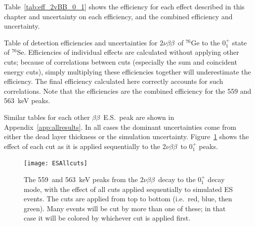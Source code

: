 \documentclass[notitlepage,rmp,aps,10pt]{revtex4-1}
\newcommand{\bb}{${\beta \beta}$}
\newcommand{\tnbb}{${2 \nu \beta \beta}$}
\newcommand{\bbes}{\bb~E.S.}
\newcommand{\iso}[2]{$^{#1}$#2}
\newcommand{\Ge}[1]{\iso{#1}{Ge}}
\newcommand{\Se}[1]{\iso{#1}{Se}}
\newcommand{\SP}[3]{$#1^{#2}_{#3}$}
\begin{document}
Table~\ref{tab:eff_2vBB_0_1} shows the efficiency for each effect described in this chapter and uncertainty on each efficiency, and the combined efficiency and uncertainty.
\begin{table}[h]
  \centering
  
  \caption[Detection efficiency summary for \tnbb\ to the \SP{0}{+}{1} state of \Se{76}]{\label{tab:eff_2vBB_0_1}
    Table of detection efficiencies and uncertainties for \tnbb\ of \Ge{76} to the \SP{0}{+}{1} state of \Se{76}. Efficiencies of individual effects are calculated without applying other cuts; because of correlations between cuts (especially the sum and coincident energy cuts), simply multiplying these efficiencies together will underestimate the efficiency. The final efficiency calculated here correctly accounts for such correlations. Note that the efficiencies are the combined efficiency for the 559 and 563~keV peaks.
  }
\end{table}
Similar tables for each other \bbes\ peak are shown in Appendix~\ref{app:allresults}.
In all cases the dominant uncertainties come from either the dead layer thickness or the simulation uncertainty.
Figure~\ref{fig:escuteffects} shows the effect of each cut as it is applied sequentially to the \tnbb\ to \SP{0}{+}{1} peaks.
\begin{figure}[htb]
  \centering
  \texttt{[image: ESAllcuts]}
  \caption[Simulated \tnbb\ to \SP{0}{+}{1} peaks with cuts applied]{\label{fig:escuteffects}
    The 559~and 563~keV peaks from the \tnbb\ decay to the \SP{0}{+}{1} decay mode, with the effect of all cuts applied sequentially to simulated ES events. The cuts are applied from top to bottom (i.e.~red, blue, then green). Many events will be cut by more than one of these; in that case it will be colored by whichever cut is applied first. 
  }
\end{figure}
\end{document}
